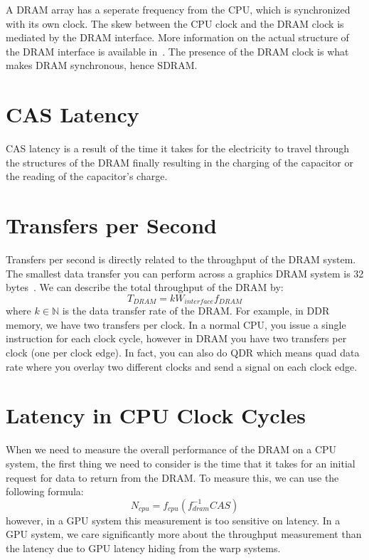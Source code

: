 A DRAM array has a seperate frequency from the CPU, which is synchronized with its own clock. The skew between the CPU clock and the DRAM clock is mediated by the DRAM interface. More information on the actual structure of the DRAM interface is available in~\cite{isca02:dram, nagano:dram}. The presence of the DRAM clock is what makes DRAM synchronous, hence SDRAM.

\section{CAS Latency}

CAS latency is a result of the time it takes for the electricity to travel through the structures of the DRAM finally resulting in the charging of the capacitor or the reading of the capacitor's charge.


\section{Transfers per Second}

Transfers per second is directly related to the throughput of the DRAM system. The smallest data transfer you can perform across a graphics DRAM system is 32 bytes~\cite{micron:gddr}. We can describe the total throughput of the DRAM by:
\begin{equation*}
  T_{DRAM}=k W_{interface} f_{DRAM}
\end{equation*}
where $k\in\mathbb{N}$ is the data transfer rate of the DRAM. For example, in DDR memory, we have two transfers per clock. In a normal CPU, you issue a single instruction for each clock cycle, however in DRAM you have two transfers per clock (one per clock edge). In fact, you can also do QDR which means quad data rate where you overlay two different clocks and send a signal on each clock edge.

\section{Latency in CPU Clock Cycles}

When we need to measure the overall performance of the DRAM on a CPU system, the first thing we need to consider is the time that it takes for an initial request for data to return from the DRAM. To measure this, we can use the following formula:
\begin{equation*}
  N_{cpu}=f_{cpu}(f^{-1}_{dram} CAS)
\end{equation*}
however, in a GPU system this measurement is too sensitive on latency. In a GPU system, we care significantly more about the throughput measurement than the latency due to GPU latency hiding from the warp systems.
